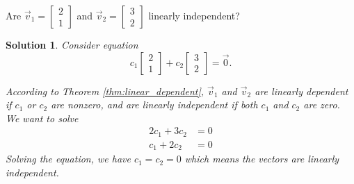 \documentclass[]{book}
\newtheorem*{solution}{Solution}
\begin{document}
\begin{example}
    Are $\vec{v}_1 = \begin{bmatrix}2 \\ 1\end{bmatrix}$ and $\vec{v}_2 = \begin{bmatrix}3 \\ 2\end{bmatrix}$ linearly independent?
\begin{solution}
    Consider equation
    \[c_1 \begin{bmatrix}2 \\ 1\end{bmatrix} + c_2 \begin{bmatrix}3 \\ 2\end{bmatrix} = \vec{0}.\]
    
    According to Theorem \ref{thm:linear_dependent}, $\vec{v}_1$ and $\vec{v}_2$ are linearly dependent if $c_1$ or $c_2$ are nonzero, and are linearly independent if both $c_1$ and $c_2$ are zero. We want to solve
    \begin{align*}
        2c_1 + 3c_2 &= 0 \\
        c_1 + 2c_2 &= 0
    \end{align*}
    Solving the equation, we have $c_1=c_2=0$ which means the vectors are linearly independent. \hfill\qedsymbol
\end{solution}
\end{example}
\end{document}
